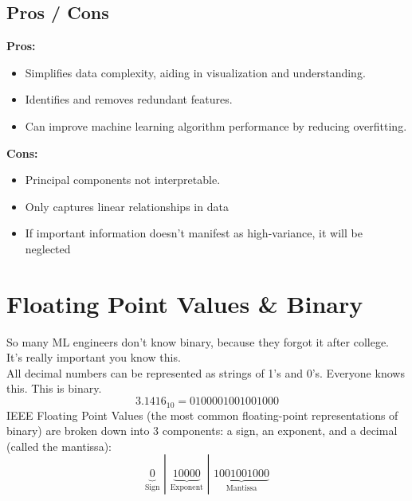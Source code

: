 \documentclass[12pt]{article}
\begin{document}
\subsection{Pros / Cons}
\textbf{Pros:}
\begin{itemize}
    \item Simplifies data complexity, aiding in visualization and understanding.
    \item Identifies and removes redundant features.
    \item Can improve machine learning algorithm performance by reducing overfitting.
\end{itemize}

\textbf{Cons:}
\begin{itemize}
    \item Principal components not interpretable.
    \item Only captures linear relationships in data
	\item If important information doesn't manifest as high-variance, it will be neglected
\end{itemize}
\section{Floating Point Values \& Binary}
So many ML engineers don't know binary, because they forgot it after college. It's really important you know this.\\

All decimal numbers can be represented as strings of 1's and 0's. Everyone knows this. This is binary. 
\[
3.1416_{10} = 0100001001001000
\]
IEEE Floating Point Values (the most common floating-point representations of binary) are broken down into 3 components: a sign, an exponent, and a decimal (called the mantissa):
\[
\underbrace{0}_{\text{Sign}} \,\, | \,\, \underbrace{10000}_{\text{Exponent}} \,\, | \,\, \underbrace{1001001000}_{\text{Mantissa}}
\]
\end{document}
